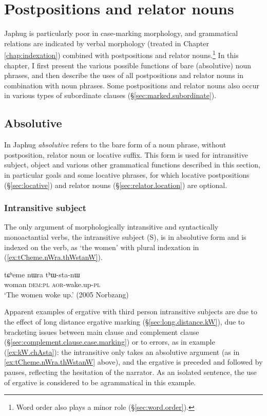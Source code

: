 \chapter{Postpositions and relator nouns} \label{chap:postpositions.relators}
Japhug is particularly poor in case-marking morphology, and grammatical relations are indicated by verbal morphology (treated in Chapter \ref{chap:indexation}) combined with postpositions and relator nouns.\footnote{Word order also plays a minor role (§\ref{sec:word.order}). } In this chapter, I first present the various possible functions of bare (absolutive) noun phrases, and then describe the uses of all postpositions and relator nouns in combination with noun phrases. Some postpositions and relator nouns also occur in various types of subordinate clauses (§\ref{sec:marked.subordinate}).
 

\section{Absolutive} \label{sec:absolutive}
In Japhug \textit{absolutive} refers to the bare form of a noun phrase, without postposition, relator noun or locative suffix. This form is used for intransitive subject, object and various other grammatical functions described in this section, in particular goals and some locative phrases, for which locative postpositions (§\ref{sec:locative}) and relator nouns (§\ref{sec:relator.location}) are optional.

\subsection{Intransitive subject} \label{sec:absolutive.S}
 
The only argument of morphologically intransitive and syntactically monoactantial verbs, the intransitive subject (S), is in absolutive form and is indexed on the verb, as  `the women' with plural indexation in (\ref{ex:tCheme.nWra.thWstanW}). 

\begin{exe}
\ex \label{ex:tCheme.nWra.thWstanW}
\gll tɕʰeme nɯra tʰɯ-sta-nɯ  \\
woman \textsc{dem}:\textsc{pl} \textsc{aor}-wake.up-\textsc{pl} \\
\glt  `The women woke up.'  (2005 Norbzang)
\end{exe}

Apparent examples of ergative  with third person intransitive subjects are due to the effect of long distance ergative marking (§\ref{sec:long.distance.kW}), due to bracketing issues between main clause and complement clause (§\ref{sec:complement.clause.case.marking}) or to errors, as in example (\ref{ex:kW.chAsta}): the intransitive  only takes an absolutive argument (as in \ref{ex:tCheme.nWra.thWstanW} above), and the ergative  is preceded and followed by pauses, reflecting the hesitation of the narrator. As an isolated sentence, the use of ergative is considered to be agrammatical in this example.

